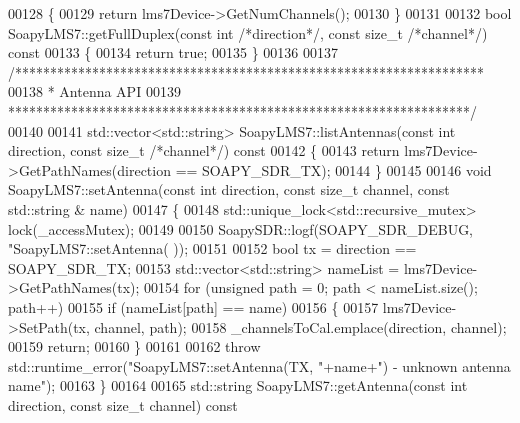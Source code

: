 \begin{DoxyCode}
{{{{{00128 \textcolor{keyword}{}\{
00129     \textcolor{keywordflow}{return} lms7Device->GetNumChannels();
00130 \}
00131 
00132 \textcolor{keywordtype}{bool} SoapyLMS7::getFullDuplex(\textcolor{keyword}{const} \textcolor{keywordtype}{int} \textcolor{comment}{/*direction*/}, \textcolor{keyword}{const} \textcolor{keywordtype}{size\_t} \textcolor{comment}{/*channel*/})\textcolor{keyword}{ const}
00133 \textcolor{keyword}{}\{
00134     \textcolor{keywordflow}{return} \textcolor{keyword}{true};
00135 \}
00136 
00137 \textcolor{comment}{/*******************************************************************}
00138 \textcolor{comment}{ * Antenna API}
00139 \textcolor{comment}{ ******************************************************************/}
00140 
00141 std::vector<std::string> SoapyLMS7::listAntennas(\textcolor{keyword}{const} \textcolor{keywordtype}{int} direction, \textcolor{keyword}{const} \textcolor{keywordtype}{size\_t} \textcolor{comment}{/*channel*/})\textcolor{keyword}{ const}
00142 \textcolor{keyword}{}\{
00143     \textcolor{keywordflow}{return} lms7Device->GetPathNames(direction == SOAPY\_SDR\_TX);
00144 \}
00145 
00146 \textcolor{keywordtype}{void} SoapyLMS7::setAntenna(\textcolor{keyword}{const} \textcolor{keywordtype}{int} direction, \textcolor{keyword}{const} \textcolor{keywordtype}{size\_t} channel, \textcolor{keyword}{const} std::string &
      name)
00147 \{
00148     std::unique\_lock<std::recursive\_mutex> lock(_accessMutex);
00149     
00150     SoapySDR::logf(SOAPY\_SDR\_DEBUG, \textcolor{stringliteral}{"SoapyLMS7::setAntenna(%
      ));
00151     
00152     \textcolor{keywordtype}{bool} tx = direction == SOAPY\_SDR\_TX;
00153     std::vector<std::string> nameList = lms7Device->GetPathNames(tx);
00154     \textcolor{keywordflow}{for} (\textcolor{keywordtype}{unsigned} path = 0; path < nameList.size(); path++)
00155         \textcolor{keywordflow}{if} (nameList[path] == name)
00156         \{
00157             lms7Device->SetPath(tx, channel, path);
00158             _channelsToCal.emplace(direction, channel);
00159             \textcolor{keywordflow}{return};
00160         \}
00161     
00162     \textcolor{keywordflow}{throw} std::runtime\_error(\textcolor{stringliteral}{"SoapyLMS7::setAntenna(TX, "}+name+\textcolor{stringliteral}{") - unknown antenna name"});
00163 \}
00164 
00165 std::string SoapyLMS7::getAntenna(\textcolor{keyword}{const} \textcolor{keywordtype}{int} direction, \textcolor{keyword}{const} \textcolor{keywordtype}{size\_t} channel)\textcolor{keyword}{ const}
}}}}}}
\end{DoxyCode}
